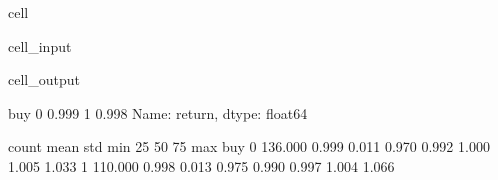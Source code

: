 \documentclass[letterpaper,10pt,english]{jupyterBook}
\begin{document}
\begin{sphinxuseclass}{cell}\begin{sphinxVerbatimInput}

\begin{sphinxuseclass}{cell_input}
\begin{sphinxVerbatim}[commandchars=\\\{\}]
   
  

 
\PYG{p}{[}\PYG{p}{]} 
\PYG{p}{[}\PYG{p}{]} 
\end{sphinxVerbatim}

\end{sphinxuseclass}\end{sphinxVerbatimInput}
\begin{sphinxVerbatimOutput}

\begin{sphinxuseclass}{cell_output}
\begin{sphinxVerbatim}[commandchars=\\\{\}]
buy
0   0.999
1   0.998
Name: return, dtype: float64


      count  mean   std   min   25\PYGZpc{}   50\PYGZpc{}   75\PYGZpc{}   max
buy                                                  
0   136.000 0.999 0.011 0.970 0.992 1.000 1.005 1.033
1   110.000 0.998 0.013 0.975 0.990 0.997 1.004 1.066
\end{sphinxVerbatim}

\end{sphinxuseclass}\end{sphinxVerbatimOutput}

\end{sphinxuseclass}
\end{document}
